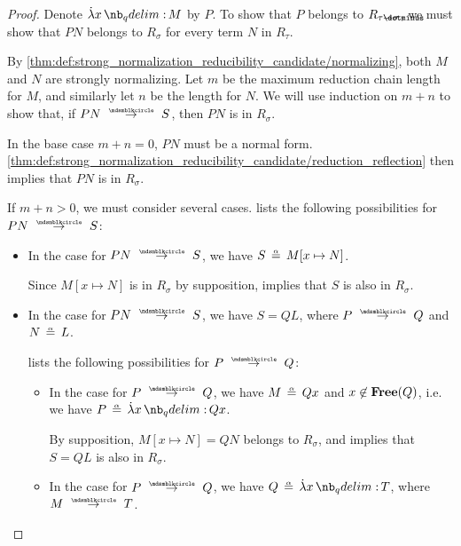 \begin{proof}
  Denote \( \qabs x M \) by \( P \). To show that \( P \) belongs to \( R_{\tau \synimplies \sigma} \), we must show that \( P N \) belongs to \( R_\sigma \) for every term \( N \) in \( R_\tau \).

  By \ref{thm:def:strong_normalization_reducibility_candidate/normalizing}, both \( M \) and \( N \) are strongly normalizing. Let \( m \) be the maximum reduction chain length for \( M \), and similarly let \( n \) be the length for \( N \). We will use induction on \( m + n \) to show that, if \( P N \pred S \), then \( P N \) is in \( R_\sigma \).

  In the base case \( m + n = 0 \), \( P N \) must be a normal form. \ref{thm:def:strong_normalization_reducibility_candidate/reduction_reflection} then implies that \( P N \) is in \( R_\sigma \).

  If \( m + n > 0 \), we must consider several cases.  lists the following possibilities for \( P N \pred S \):
  \begin{itemize}
    \item In the case  for \( P N \pred S \), we have \( S \aequiv M[x \mapsto N] \).

    Since \( M[x \mapsto N] \) is in \( R_\sigma \) by supposition,  implies that \( S \) is also in \( R_\sigma \).

    \item In the case  for \( P N \pred S \), we have \( S = Q L \), where \( P \pred Q \) and \( N \aequiv L \).

     lists the following possibilities for \( P \pred Q \):
    \begin{itemize}
      \item In the case  for \( P \pred Q \), we have \( M \aequiv Qx \) and \( x \not\in \op*{Free}(Q) \), i.e. we have \( P \aequiv \qabs x Qx \).

      By supposition, \( M[x \mapsto N] = QN \) belongs to \( R_\sigma \), and  implies that \( S = Q L \) is also in \( R_\sigma \).

      \item In the case  for \( P \pred Q \), we have \( Q \aequiv \qabs x T \), where \( M \pred T \).


\end{itemize}
\end{itemize}
\end{proof}

